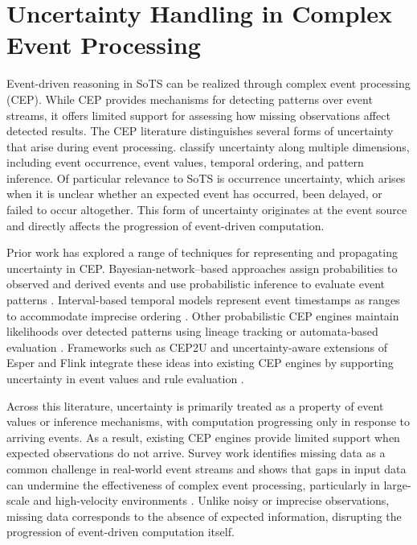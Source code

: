 \section{Uncertainty Handling in Complex Event Processing}
Event-driven reasoning in SoTS can be realized through complex event processing (CEP). While CEP provides mechanisms for detecting patterns over event streams, it offers limited support for assessing how missing observations affect detected results. The CEP literature distinguishes several forms of uncertainty that arise during event processing. \citet{wasserkrug2006taxonomy} classify uncertainty along multiple dimensions, including event occurrence, event values, temporal ordering, and pattern inference. Of particular relevance to SoTS is occurrence uncertainty, which arises when it is unclear whether an expected event has occurred, been delayed, or failed to occur altogether. This form of uncertainty originates at the event source and directly affects the progression of event-driven computation.

Prior work has explored a range of techniques for representing and propagating uncertainty in CEP. Bayesian-network--based approaches assign probabilities to observed and derived events and use probabilistic inference to evaluate event patterns \citep{wasserkrug2010efficient, wasserkrug2012model}. Interval-based temporal models represent event timestamps as ranges to accommodate imprecise ordering \citep{zhang2013recognizing}. Other probabilistic CEP engines maintain likelihoods over detected patterns using lineage tracking or automata-based evaluation \citep{shen2008probabilistic, kawashima2010complex, chuanfei2010complex, wang2013complex}. Frameworks such as CEP2U and uncertainty-aware extensions of Esper and Flink integrate these ideas into existing CEP engines by supporting uncertainty in event values and rule evaluation \citep{cugola2015introducing, moreno2019managing}.

Across this literature, uncertainty is primarily treated as a property of event values or inference mechanisms, with computation progressing only in response to arriving events. As a result, existing CEP engines provide limited support when expected observations do not arrive. Survey work identifies missing data as a common challenge in real-world event streams and shows that gaps in input data can undermine the effectiveness of complex event processing, particularly in large-scale and high-velocity environments \citep{tawsif2018review}. Unlike noisy or imprecise observations, missing data corresponds to the absence of expected information, disrupting the progression of event-driven computation itself.

